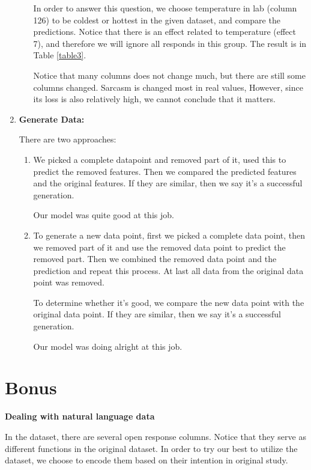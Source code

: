 \documentclass[11pt, a4paper]{article}
\begin{document}
\begin{enumerate}
\begin{itemize}
		\par{In order to answer this question, we choose temperature in lab (column 126) to be coldest or hottest in the given dataset, and compare the predictions. Notice that there is an effect related to temperature (effect 7), and therefore we will ignore all responds in this group. The result is in Table \ref{table3}.
			
			Notice that many columns does not change much, but there are still some columns changed. Sarcasm is changed most in real values, However, since its loss is also relatively high, we cannot conclude that it matters.}
	\end{itemize}
	
	
	
	\item {\textbf{Generate Data:}}
	\par{There are two approaches:}
	\begin{enumerate}
		\item {}
		\par{We picked a complete datapoint and removed part of it, used this to predict the removed features. Then we compared the predicted features and the original features. If they are similar, then we say it's a successful generation. }
		\par{Our model was quite good at this job.}
		\item {}
		\par{To generate a new data point, first we picked a complete data point, then we removed part of it and use the removed data point to predict the removed part. Then we combined the removed data point and the prediction and repeat this process. At last all data from the original data point was removed. }
		\par{To determine whether it's good, we compare the new data point with the original data point. If they are similar, then we say it's a successful generation.}
		\par{Our model was doing alright at this job.}
	\end{enumerate}
\end{enumerate}


\section{Bonus}
\label{sec:Bonus}
\par{\textbf{Dealing with natural language data}}
\par{In the dataset, there are several open response columns. Notice that they serve as different functions in the original dataset. In order to try our best to utilize the dataset, we choose to encode them based on their intention in original study.}
\end{document}
